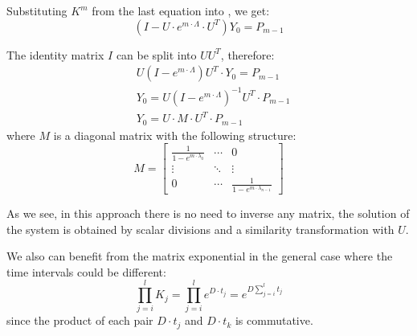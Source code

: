 Substituting $K^m$ from the last equation into , we get:
\[
  (I - U \cdot e^{m \cdot \Lambda} \cdot U^T) Y_0 = P_{m - 1}
\]

The identity matrix $I$ can be split into $U U^T$, therefore:
\begin{align*}
  & U (I - e^{m \cdot \Lambda}) U^T \cdot Y_0 = P_{m - 1} \\
  & Y_0 = U (I - e^{m \cdot \Lambda})^{-1} U^T \cdot P_{m - 1} \\
  & Y_0 = U \cdot M \cdot U^T \cdot P_{m - 1}
\end{align*}
where $M$ is a diagonal matrix with the following structure:
\[
  M = \left[
    \begin{array}{ccc}
      \frac{1}{1 - e^{m \cdot \lambda_0}} & \cdots & 0 \\
      \vdots & \ddots & \vdots \\
      0 & \cdots & \frac{1}{1 - e^{m \cdot \lambda_{n - 1}}}
    \end{array}
  \right]
\]

As we see, in this approach there is no need to inverse any matrix, the solution of the system is obtained by scalar divisions and a similarity transformation with $U$.

We also can benefit from the matrix exponential in the general case where the time intervals could be different:
\[
  \prod_{j = i}^l K_j = \prod_{j = i}^l e^{D \cdot t_j} = e^{D \sum_{j = i}^l t_j}
\]
since the product of each pair $D \cdot t_j$ and $D \cdot t_k$ is commutative.
